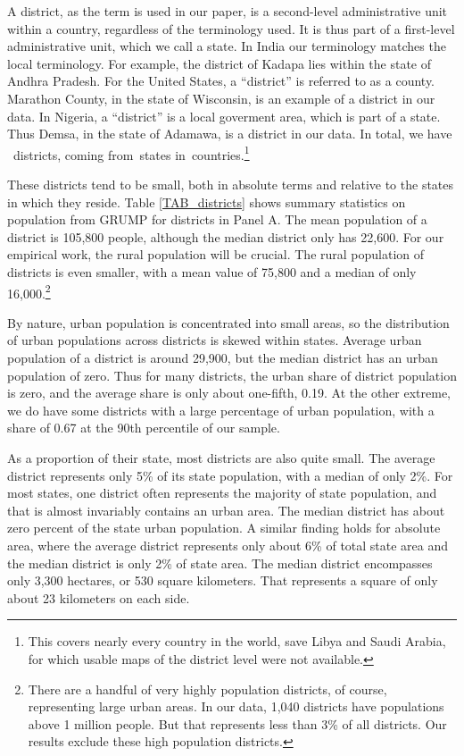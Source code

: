 \documentclass[12pt]{article}
\begin{document}
A district, as the term is used in our paper, is a second-level administrative unit within a country, regardless of the terminology used. It is thus part of a first-level administrative unit, which we call a state. In India our terminology matches the local terminology. For example, the district of Kadapa lies within the state of Andhra Pradesh. For the United States, a ``district'' is referred to as a county. Marathon County, in the state of Wisconsin, is an example of a district in our data. In Nigeria, a ``district'' is a local goverment area, which is part of a state. Thus Demsa, in the state of Adamawa, is a district in our data. In total, we have \districts \ districts, coming from\provinces \ states in\countries \ countries.\footnote{This covers nearly every country in the world, save Libya and Saudi Arabia, for which usable maps of the district level were not available.}

These districts tend to be small, both in absolute terms and relative to the states in which they reside. Table \ref{TAB_districts} shows summary statistics on population from GRUMP \citep{grump2011} for districts in Panel A. The mean population of a district is 105,800 people, although the median district only has 22,600. For our empirical work, the rural population will be crucial. The rural population of districts is even smaller, with a mean value of 75,800 and a median of only 16,000.\footnote{There are a handful of very highly population districts, of course, representing large urban areas. In our data, 1,040 districts have populations above 1 million people. But that represents less than 3\% of all districts. Our results exclude these high population districts.}

By nature, urban population is concentrated into small areas, so the distribution of urban populations across districts is skewed within states. Average urban population of a district is around 29,900, but the median district has an urban population of zero. Thus for many districts, the urban share of district population is zero, and the average share is only about one-fifth, 0.19. At the other extreme, we do have some districts with a large percentage of urban population, with a share of 0.67 at the 90th percentile of our sample.

As a proportion of their state, most districts are also quite small. The average district represents only 5\% of its state population, with a median of only 2\%. For most states, one district often represents the majority of state population, and that is almost invariably contains an urban area. The median district has about zero percent of the state urban population. A similar finding holds for absolute area, where the average district represents only about 6\% of total state area and the median district is only 2\% of state area. The median district encompasses only 3,300 hectares, or 530 square kilometers. That represents a square of only about 23 kilometers on each side. 
\end{document}
